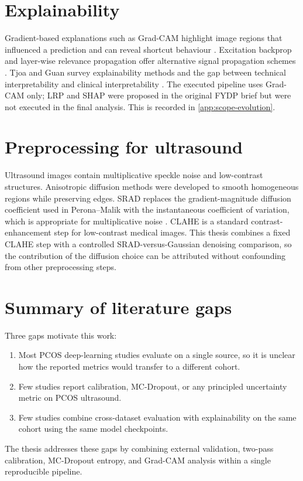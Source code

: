 \documentclass[../preamble.tex]{subfiles}
\begin{document}
\section{Explainability}
\label{sec:bg-xai}

Gradient-based explanations such as Grad-CAM highlight image regions that
influenced a prediction and can reveal shortcut behaviour
\cite{selvaraju2017}. Excitation backprop and layer-wise relevance
propagation offer alternative signal propagation schemes
\cite{zhang2018,samek2017}. Tjoa and Guan survey explainability methods and
the gap between technical interpretability and clinical interpretability
\cite{tjoa2021}. The executed pipeline uses Grad-CAM only; LRP and SHAP were
proposed in the original FYDP brief but were not executed in the final
analysis. This is recorded in \cref{app:scope-evolution}.

\section{Preprocessing for ultrasound}
\label{sec:bg-preprocessing}

Ultrasound images contain multiplicative speckle noise and low-contrast
structures. Anisotropic diffusion methods were developed to smooth
homogeneous regions while preserving edges. SRAD replaces the
gradient-magnitude diffusion coefficient used in Perona--Malik with the
instantaneous coefficient of variation, which is appropriate for
multiplicative noise \cite{yu2002}. CLAHE is a standard contrast-enhancement
step for low-contrast medical images. This thesis combines a fixed CLAHE
step with a controlled SRAD-versus-Gaussian denoising comparison, so the
contribution of the diffusion choice can be attributed without confounding
from other preprocessing steps.

\section{Summary of literature gaps}
\label{sec:bg-gaps}

Three gaps motivate this work:

\begin{enumerate}
  \item Most PCOS deep-learning studies evaluate on a single source, so it is
        unclear how the reported metrics would transfer to a different cohort.
  \item Few studies report calibration, MC-Dropout, or any principled
        uncertainty metric on PCOS ultrasound.
  \item Few studies combine cross-dataset evaluation with explainability on
        the same cohort using the same model checkpoints.
\end{enumerate}

The thesis addresses these gaps by combining external validation, two-pass
calibration, MC-Dropout entropy, and Grad-CAM analysis within a single
reproducible pipeline.
\end{document}
